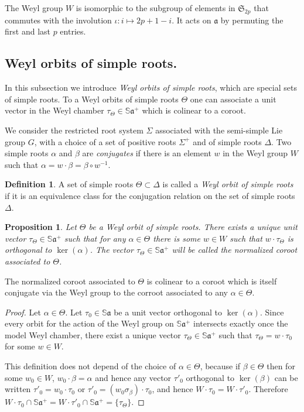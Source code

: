 \documentclass[reqno,10pt]{amsart}
\theoremstyle{plain}
\newtheorem{prop}[thm]{Proposition}
\theoremstyle{definition}
\newtheorem{defn}[thm]{Definition}
\theoremstyle{remark}
\newcommand{\type}{\tau}
\newcommand{\Sph}{\mathbb{S}}
\begin{document}
The Weyl group $W$ is isomorphic to the subgroup of elements in $\mathfrak{S}_{2p}$ that commutes with the involution $\iota:i\mapsto 2p+1-i$. It acts on $\mathfrak{a}$ by permuting the first and last $p$ entries.

\subsection{Weyl orbits of simple roots.}
\label{sec:RootSpecial}

In this subsection we introduce \emph{Weyl orbits of simple roots}, which are special sets of simple roots. To a Weyl orbits of simple roots $\Theta$ one can associate a unit vector in the Weyl chamber $\type_\Theta\in \Sph\mathfrak{a}^+$ which is colinear to a coroot. 

\medskip

We consider the restricted root system $\Sigma$ associated with the semi-simple Lie group $G$, with a choice of a set of positive roots $\Sigma^+$ and of simple roots $\Delta$. 
Two simple roots $\alpha$ and $\beta$ are \emph{conjugates} if there is an element $w$ in the Weyl group $W$ such that $\alpha=w\cdot \beta=\beta\circ w^{-1}$.
 
\begin{defn}
A set of simple roots $\Theta\subset \Delta$ is called a \emph{Weyl orbit of simple roots} if it is an equivalence class for the conjugation relation on the set of simple roots $\Delta$.
\end{defn}


\begin{prop}
Let $\Theta$ be a Weyl orbit of simple roots. There exists a unique unit vector $\type_\Theta\in \Sph\mathfrak{a}^+$ such that for any $\alpha \in \Theta$ there is some $w\in W$ such that $w\cdot \type_\Theta$ is orthogonal to $\ker(\alpha)$. 
The vector $\type_\Theta\in \Sph\mathfrak{a}^+$ will be called the \emph{normalized coroot} associated to $\Theta$.
\end{prop}

The normalized coroot associated to $\Theta$ is colinear to a coroot which is itself conjugate via the Weyl group to the corroot associated to any $\alpha\in \Theta$.

\medskip

\begin{proof}
Let $\alpha\in \Theta$. Let $\type_0\in \Sph\mathfrak{a}$ be a unit vector orthogonal to $\ker(\alpha)$. Since every orbit for the action of the Weyl group on $\Sph\mathfrak{a}^+$ intersects exactly once the model Weyl chamber, there exist a unique vector $\type_\Theta\in \Sph\mathfrak{a}^+$ such that $\type_\Theta=w\cdot \type_0$ for some $w\in W$. 

This definition does not depend of the choice of $\alpha\in \Theta$, because if $\beta\in \Theta$ then for some $w_0\in W$, $w_0\cdot \beta=\alpha$ and hence any vector $\type'_0$ orthogonal  to $\ker(\beta)$ can be written $\type'_0=w_0\cdot \type_0$ or $\type'_0=(w_0\sigma_\beta)\cdot \type_0$, and hence $W\cdot \type_0=W\cdot \type'_0$. Therefore $W\cdot \type_0\cap \Sph\mathfrak{a}^+=W\cdot \type'_0\cap \Sph\mathfrak{a}^+=\lbrace \type_\Theta\rbrace$.
\end{proof} 
\end{document}
